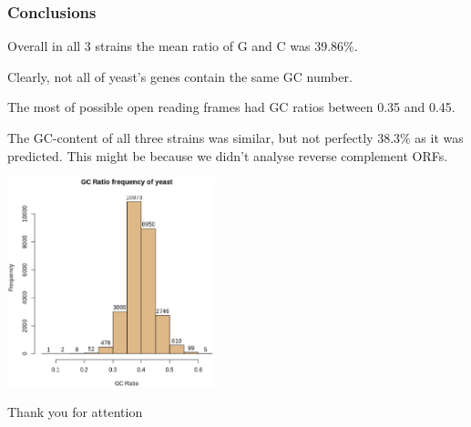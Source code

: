 \documentclass{beamer}
\begin{document}
\begin{frame}
\frametitle{Conclusions}

Overall in all 3 strains the mean ratio of G and C was 39.86\%.

Clearly, not all of yeast's genes contain the same GC number.

The most of possible open reading frames had GC ratios between 0.35 and 0.45. 

The GC-content of all three strains was similar, but not perfectly 38.3\% as it was predicted. This might be because we didn't analyse reverse complement ORFs.

\begin{minipage}{0.5\textwidth}
\includegraphics[width=60mm]{images/AllGenomes.eps}
\end{minipage}
\end{frame}


\begin{frame}
\Huge{\centerline{Thank you for attention}}
\end{frame}

\end{document}
